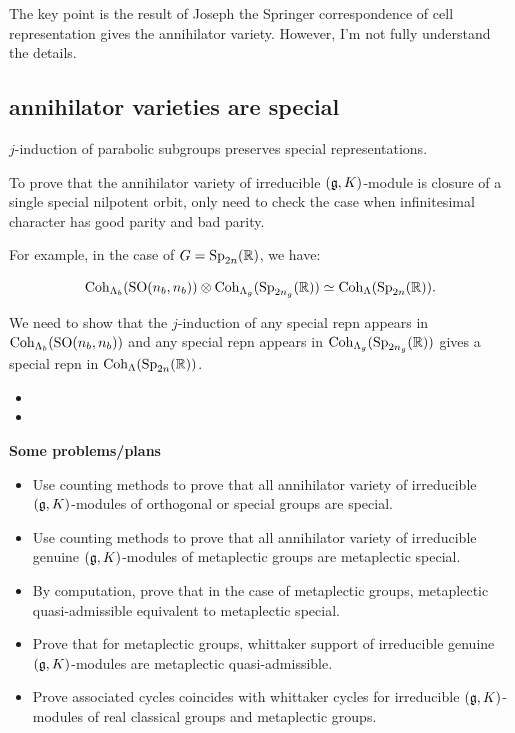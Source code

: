 \begin{rk}
  The key point is the result of Joseph \cite{Jos85} the Springer correspondence of cell representation gives the annihilator variety. However, I'm not fully understand the details.
\end{rk}


\subsection{annihilator varieties are special}

$j$-induction of parabolic subgroups preserves special representations.

To prove that the annihilator variety of irreducible $(\mathfrak{g},K)$-module is closure of a single special nilpotent orbit, only need to check the case when infinitesimal character has good parity and bad parity.

For example, in the case of $G = \operatorname{Sp}_{2n}(\mathbb{R})$, we have:

\[\operatorname{Coh}_{\Lambda_b}(\operatorname{SO}(n_b,n_b)) \otimes \operatorname{Coh}_{\Lambda_g}(\operatorname{Sp}_{2n_g}(\mathbb{R})) \simeq \operatorname{Coh}_{\Lambda}(\operatorname{Sp}_{2n}(\mathbb{R})).\]

We need to show that the $j$-induction of any special repn appears in $\operatorname{Coh}_{\Lambda_b}(\operatorname{SO}(n_b,n_b))$ and any special repn appears in $\operatorname{Coh}_{\Lambda_g}(\operatorname{Sp}_{2n_g}(\mathbb{R}))$ gives a special repn in $\operatorname{Coh}_{\Lambda}(\operatorname{Sp}_{2n}(\mathbb{R}))$.

\begin{itemize}
  \item {}
  \item {}
\end{itemize}




\textbf{Some problems/plans}
\begin{itemize}
  \item Use counting methods to prove that all annihilator variety of irreducible $(\mathfrak{g},K)$-modules of orthogonal or special groups are special.
  \item Use counting methods to prove that all annihilator variety of irreducible genuine $(\mathfrak{g},K)$-modules of metaplectic groups are metaplectic special.
  \item By computation, prove that in the case of metaplectic groups, metaplectic quasi-admissible equivalent to metaplectic special. 
  \item Prove that for metaplectic groups, whittaker support of irreducible genuine $(\mathfrak{g},K)$-modules are metaplectic quasi-admissible. 
  \item Prove associated cycles coincides with whittaker cycles for irreducible $(\mathfrak{g},K)$-modules of real classical groups and metaplectic groups.
\end{itemize}




